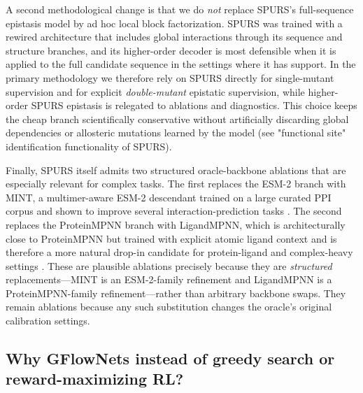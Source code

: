 \documentclass[11pt]{article}
\begin{document}
A second methodological change is that we do \emph{not} replace SPURS's full-sequence epistasis model by ad hoc local block factorization. SPURS was trained with a rewired architecture that includes global interactions through its sequence and structure branches, and its higher-order decoder is most defensible when it is applied to the full candidate sequence in the settings where it has support. In the primary methodology we therefore rely on SPURS directly for single-mutant supervision and for explicit \emph{double-mutant} epistatic supervision, while higher-order SPURS epistasis is relegated to ablations and diagnostics. This choice keeps the cheap branch scientifically conservative without artificially discarding global dependencies or allosteric mutations learned by the model (see "functional site" identification functionality of SPURS). 

Finally, SPURS itself admits two structured oracle-backbone ablations that are especially relevant for complex tasks. The first replaces the ESM-2 branch with MINT, a multimer-aware ESM-2 descendant trained on a large curated PPI corpus and shown to improve several interaction-prediction tasks \citep{ullanat2025mint}. The second replaces the ProteinMPNN branch with LigandMPNN, which is architecturally close to ProteinMPNN but trained with explicit atomic ligand context and is therefore a more natural drop-in candidate for protein-ligand and complex-heavy settings \citep{dauparas2025ligandmpnn}. These are plausible ablations precisely because they are \emph{structured} replacements---MINT is an ESM-2-family refinement and LigandMPNN is a ProteinMPNN-family refinement---rather than arbitrary backbone swaps. They remain ablations because any such substitution changes the oracle's original calibration settings.


\subsection{Why GFlowNets instead of greedy search or reward-maximizing RL?}

\begin{center}
\end{center}
\end{document}
